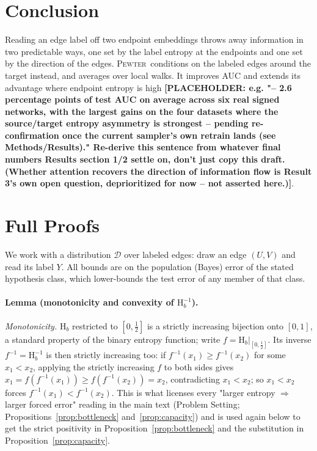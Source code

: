 \documentclass[letterpaper]{article} %
\newcommand{\method}{\textsc{Pewter}\xspace}
\newcommand{\ph}[1]{\textbf{[#1]}}  %
\newcommand{\Hh}{\mathrm{H}}
\theoremstyle{plain}
\theoremstyle{definition}
\begin{document}
\section{Conclusion}
Reading an edge label off two endpoint embeddings throws away information in two predictable ways, one set by the label entropy at the endpoints and one set by the direction of the edges. \method\ conditions on the labeled edges around the target instead, and averages over local walks. It improves AUC and extends its advantage where endpoint entropy is high \ph{PLACEHOLDER: e.g. "-- 2.6 percentage points of test AUC on average across six real signed networks, with the largest gains on the four datasets where the source/target entropy asymmetry is strongest -- pending re-confirmation once the current sampler's own retrain lands (see Methods/Results)." Re-derive this sentence from whatever final numbers Results section 1/2 settle on, don't just copy this draft. (Whether attention recovers the direction of information flow is Result 3's own open question, deprioritized for now -- not asserted here.)}.

\appendix
\section{Full Proofs}
\label{app:proofs}
We work with a distribution $\mathcal{D}$ over labeled edges: draw an edge $(U,V)$ and read its label $Y$. All bounds are on the population (Bayes) error of the stated hypothesis class, which lower-bounds the test error of any member of that class.

\paragraph{Lemma (monotonicity and convexity of $\Hh_b^{-1}$).}
\emph{Monotonicity.} $\Hh_b$ restricted to $[0,\tfrac12]$ is a strictly increasing bijection onto $[0,1]$, a standard property of the binary entropy function; write $f=\Hh_b|_{[0,\tfrac12]}$. Its inverse $f^{-1}=\Hh_b^{-1}$ is then strictly increasing too: if $f^{-1}(x_1)\ge f^{-1}(x_2)$ for some $x_1<x_2$, applying the strictly increasing $f$ to both sides gives $x_1=f(f^{-1}(x_1))\ge f(f^{-1}(x_2))=x_2$, contradicting $x_1<x_2$; so $x_1<x_2$ forces $f^{-1}(x_1)<f^{-1}(x_2)$. This is what licenses every "larger entropy $\Rightarrow$ larger forced error" reading in the main text (Problem Setting; Propositions~\ref{prop:bottleneck} and~\ref{prop:capacity}) and is used again below to get the strict positivity in Proposition~\ref{prop:bottleneck} and the substitution in Proposition~\ref{prop:capacity}.
\end{document}
